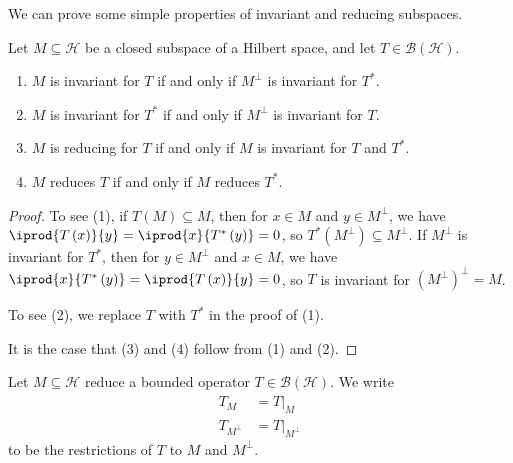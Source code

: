 \documentclass[10pt]{mypackage}
\begin{document}
We can prove some simple properties of invariant and reducing subspaces.
\begin{lemma}
  Let $M\subseteq \mathcal{H}$ be a closed subspace of a Hilbert space, and let $T\in \mathcal{B}\left(\mathcal{H}\right)$.
  \begin{enumerate}[(1)]
    \item $M$ is invariant for $T$ if and only if $M^{\perp}$ is invariant for $T^{\ast}$.
    \item $M$ is invariant for $T^{\ast}$ if and only if $M^{\perp}$ is invariant for $T$.
    \item $M$ is reducing for $T$ if and only if $M$ is invariant for $T$ and $T^{\ast}$.
    \item $M$ reduces $T$ if and only if $M$ reduces $T^{\ast}$.
  \end{enumerate}
\end{lemma}
\begin{proof}
  To see (1), if $T\left(M\right)\subseteq M$, then for $x\in M$ and $y\in M^{\perp}$, we have $ \iprod{T\left(x\right)}{y} = \iprod{x}{T^{\ast}\left(y\right)} = 0 $, so $T^{\ast}\left(M^{\perp}\right)\subseteq M^{\perp}$. If $M^{\perp}$ is invariant for $T^{\ast}$, then for $y\in M^{\perp}$ and $x\in M$, we have $ \iprod{x}{T^{\ast}\left(y\right)} = \iprod{T\left(x\right)}{y} = 0 $, so $T$ is invariant for $\left(M^{\perp}\right)^{\perp} = M$.\newline

  To see (2), we replace $T$ with $T^{\ast}$ in the proof of (1).\newline

  It is the case that (3) and (4) follow from (1) and (2).
\end{proof}
\begin{definition}
  Let $M\subseteq \mathcal{H}$ reduce a bounded operator $T\in \mathcal{B}\left(\mathcal{H}\right)$. We write
  \begin{align*}
    T_M &= T|_{M}\\
    T_{M^{\perp}} &= T|_{M^{\perp}}
  \end{align*}
  to be the restrictions of $T$ to $M$ and $M^{\perp}$.
\end{definition}
\end{document}
